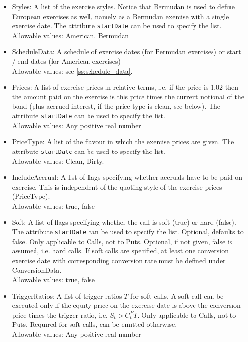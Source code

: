 \begin{itemize}

\item Styles: A list of the exercise styles. Notice that Bermudan is used to define European exercises as well, namely
as a Bermudan exercise with a single exercise date. The attribute \verb+startDate+ can be used to specify the list. \\
Allowable values: American, Bermudan

\item ScheduleData: A schedule of exercise dates (for Bermudan exercises) or start / end dates (for American exercises) \\
  Allowable values: see \ref{ss:schedule_data}.

\item Prices: A list of exercise prices in relative terms, i.e. if the price is $1.02$ then the amount paid on the
  exercise is this price times the current notional of the bond (plus accrued interest, if the price type is clean, see
  below). The attribute \verb+startDate+ can be used to specify the list.\\
  Allowable values: Any positive real number.

\item PriceType: A list of the flavour in which the exercise prices are given. The attribute \verb+startDate+ can be
  used to specify the list.\\
  Allowable values: Clean, Dirty.

\item IncludeAccrual: A list of flags specifying whether accruals have to be paid on exercise. This is independent of
  the quoting style of the exercise prices (PriceType).\\
  Allowable values: true, false

\item Soft: A list of flags specifying whether the call is soft (true) or hard (false). The attribute \verb+startDate+
  can be used to specify the list. Optional, defaults to false. Only applicable to Calls, not to Puts. Optional, if not
  given, false is assumed, i.e. hard calls. If soft calls are specified, at least one conversion exercise date with
  corresponding conversion rate must be defined under ConversionData. \\
  Allowable values: true, false

\item TriggerRatios: A list of trigger ratios $T$ for soft calls. A soft call can be executed only if the equity price
  on the exercise date is above the conversion price times the trigger ratio, i.e. $S_t > C^P_tT$. Only applicable to
  Calls, not to Puts. Required for soft calls, can be omitted otherwise.\\
  Allowable values: Any positive real number.


\end{itemize}

